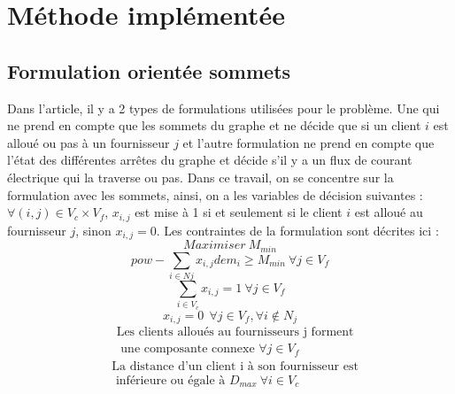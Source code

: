 \documentclass[letterpaper]{article}
\begin{document}
\section{Méthode implémentée}
\subsection{Formulation orientée sommets}
Dans l'article, il y a 2 types de formulations utilisées pour le problème. Une qui ne prend en compte que les sommets du graphe et ne décide que si un client $i$ est alloué ou pas à un fournisseur $j$ et l'autre formulation ne prend en compte que l'état des différentes arrêtes du graphe et décide s'il y a un flux de courant électrique qui la traverse ou pas.\newline\indent
Dans ce travail, on se concentre sur la formulation avec les sommets, ainsi, on a les variables de décision suivantes : $\forall (i,j) \in V_{c}\times V_{f}$, $ x_{i,j}$ est mise à 1 si et seulement si le client $i$ est alloué au fournisseur $j$, sinon $x_{i,j}=0$. Les contraintes de la formulation sont décrites ici :
\begin{equation}\label{eq:Obj}
Maximiser \ M_{min}
\end{equation}
\begin{equation}\label{eq:powDem}
pow -\sum_{i \in N{j}}{x_{i,j}dem_{i}} \geq M_{min} \ \forall j \in V_{f}
\end{equation}
\begin{equation}\label{eq:oneFeeder}
\sum_{i \in V_{c}}{x_{i,j}}=1 \ \forall j \in V_{f}
\end{equation}
\begin{equation}\label{eq:N_j}
x_{i,j}=0 \ \ \forall j \in V_{f},\forall i \notin N_{j}
\end{equation}
\begin{equation}
\begin{aligned}\label{eq:connect}
&\mbox{Les clients alloués au fournisseurs j forment}\\
&\mbox{ une composante connexe }  \forall j \in V_{f}
\end{aligned}
\end{equation}
\begin{equation}\label{eq:dist}
\begin{aligned}
&\mbox{La distance d'un client i à son fournisseur est}\\ 
&\mbox{ inférieure ou égale à } D_{max} \ \forall i \in V_{c}
\end{aligned}
\end{equation}
\end{document}
